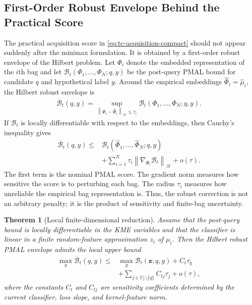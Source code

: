 \documentclass[10pt,journal]{IEEEtran}
\newtheorem{theorem}{Theorem}
\newcommand{\Hcal}{\mathcal{H}}
\newcommand{\wh}{\widehat}
\newcommand{\norm}[1]{\left\lVert #1 \right\rVert}
\begin{document}
\subsection{First-Order Robust Envelope Behind the Practical Score}
\label{subsec:first-order-envelope}

The practical acquisition score in \eqref{eq:tc-acquisition-compact} should not appear suddenly after the minimax formulation. It is obtained by a first-order robust envelope of the Hilbert problem. Let $\Phi_i$ denote the embedded representation of the $i$th bag and let $\mathcal{B}_t(\Phi_1,\ldots,\Phi_N;q,y)$ be the post-query PMAL bound for candidate $q$ and hypothetical label $y$. Around the empirical embeddings $\wh\Phi_i=\wh\mu_i$, the Hilbert robust envelope is
\begin{equation}
\label{eq:h-envelope-first-order}
\begin{aligned}
\overline{\mathcal B}_t(q,y)
=\sup_{\norm{\Phi_i-\wh\Phi_i}_{\Hcal}\le \tau_i}
\mathcal{B}_t(\Phi_1,\ldots,\Phi_N;q,y).
\end{aligned}
\end{equation}
If $\mathcal B_t$ is locally differentiable with respect to the embeddings, then Cauchy's inequality gives
\begin{equation}
\label{eq:first-order-bound}
\begin{aligned}
\overline{\mathcal B}_t(q,y)
\le{}&
\mathcal B_t(\wh\Phi_1,\ldots,\wh\Phi_N;q,y)\\
&+\sum_{i=1}^{N}\tau_i
\norm{\nabla_{\Phi_i}\mathcal B_t}_{\Hcal}
+o(\tau).
\end{aligned}
\end{equation}
The first term is the nominal PMAL score. The gradient norm measures how sensitive the score is to perturbing each bag. The radius $\tau_i$ measures how unreliable the empirical bag representation is. Thus, the robust correction is not an arbitrary penalty; it is the product of sensitivity and finite-bag uncertainty.

\begin{theorem}[Local finite-dimensional reduction]
\label{thm:local-fd-reduction}
Assume that the post-query bound is locally differentiable in the KME variables and that the classifier is linear in a finite random-feature approximation $z_i$ of $\mu_i$. Then the Hilbert robust PMAL envelope admits the local upper bound
\begin{equation}
\label{eq:local-fd-theorem}
\begin{aligned}
\max_y\overline{\mathcal B}_t(q,y)
\le{}&
\max_y\mathcal B_t(\mathbf z;q,y)+ C_t\tau_q\\
&+\sum_{j\in U_t\setminus\{q\}} C_{tj}\tau_j
+o(\tau),
\end{aligned}
\end{equation}
where the constants $C_t$ and $C_{tj}$ are sensitivity coefficients determined by the current classifier, loss slope, and kernel-feature norm.
\end{theorem}
\end{document}
